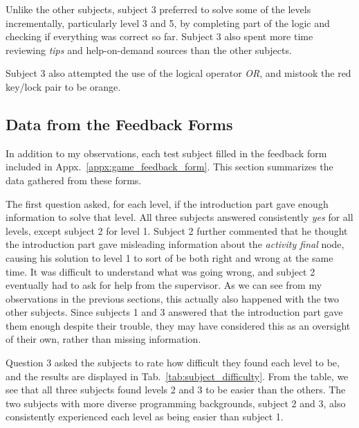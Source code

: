 \noindent
Unlike the other subjects, subject 3 preferred to solve some of the levels incrementally, particularly level 3 and 5, by completing part of the logic and checking if everything was correct so far. Subject 3 also spent more time reviewing \emph{tips} and help-on-demand sources than the other subjects. 

\noindent
Subject 3 also attempted the use of the logical operator \emph{OR}, and mistook the red key/lock pair to be orange.

\subsection{Data from the Feedback Forms}
\label{sec:game_feedback_data}
In addition to my observations, each test subject filled in the feedback form included in Appx.~\ref{appx:game_feedback_form}. This section summarizes the data gathered from these forms.

\noindent
The first question asked, for each level, if the introduction part gave enough information to solve that level. All three subjects answered consistently \emph{yes} for all levels, except subject 2 for level 1. Subject 2 further commented that he thought the introduction part gave misleading information about the \emph{activity final} node, causing his solution to level 1 to sort of be both right and wrong at the same time. It was difficult to understand what was going wrong, and subject 2 eventually had to ask for help from the supervisor. As we can see from my observations in the previous sections, this actually also happened with the two other subjects. Since subjects 1 and 3 answered that the introduction part gave them enough despite their trouble, they may have considered this as an oversight of their own, rather than missing information.

\noindent
Question 3 asked the subjects to rate how difficult they found each level to be, and the results are displayed in Tab.~\ref{tab:subject_difficulty}. From the table, we see that all three subjects found levels 2 and 3 to be easier than the others. The two subjects with more diverse programming backgrounds, subject 2 and 3, also consistently experienced each level as being easier than subject 1.

